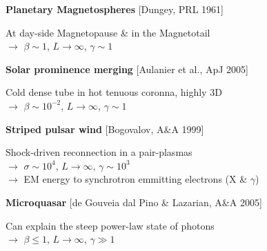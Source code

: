 \documentclass[landscape]{slides}
\begin{document}
\begin{slide}
\large{\textbf{Planetary Magnetospheres} [Dungey, PRL 1961]}



At day-side Magnetopause \& in the Magnetotail\\
$\rightarrow$ $\beta \sim 1$, $L \rightarrow \infty$, $\gamma \sim 1$

\end{slide}

\begin{slide}
\large{\textbf{Solar prominence merging} [Aulanier et al., ApJ 2005]}



Cold dense tube in hot tenuous coronna, highly 3D\\
$\rightarrow$ $\beta \sim 10^{-2}$, $L \rightarrow \infty$, $\gamma \sim 1$

\end{slide}

\begin{slide}
\large{\textbf{Striped pulsar wind} [Bogovalov, A\&A 1999]}



Shock-driven reconnection in a pair-plasmas\\
$\rightarrow$ $\sigma \sim 10^4$, $L \rightarrow \infty$, $\gamma \sim 10^3$\\
$\rightarrow$ EM energy to synchrotron emmitting electrons (X \& $\gamma$)

\end{slide}

\begin{slide}
\large{\textbf{Microquasar} [de Gouveia dal Pino \& Lazarian, A\&A 2005]}


Can explain the steep power-law state of photons\\
$\rightarrow$ $\beta \leq 1$, $L \rightarrow \infty$, $\gamma \gg 1$\\

\end{slide}

\end{document}
